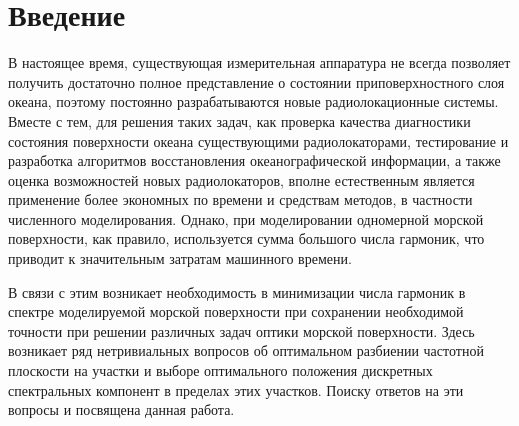 


\def\labauthors{Понур К.А.}
\def\labgroup{430}

\def\labtheme{Численное моделирование морской поверхности}
\newcommand{\tM}{\widetilde{M}}

\renewcommand{\Re}{\operatorname{Re}}
\renewcommand{\Im}{\operatorname{Im}}
\renewcommand{\phi}{\varphi}
\renewcommand{\hat}{\widehat}
\renewcommand{\vec}{\vv}

\tableofcontents
\newpage


\section{Введение}
В настоящее время, существующая измерительная аппаратура не всегда позволяет получить достаточно полное представление о состоянии приповерхностного  слоя океана, поэтому постоянно разрабатываются новые радиолокационные системы. 
Вместе с тем, для решения таких задач, как проверка качества диагностики состояния поверхности океана существующими радиолокаторами, тестирование и разработка алгоритмов восстановления океанографической информации, а также оценка возможностей новых радиолокаторов, вполне естественным является применение более экономных по времени и средствам методов, в частности численного моделирования.  Однако, при моделировании одномерной морской поверхности, как правило, используется сумма большого числа гармоник, что приводит к значительным затратам машинного времени.

В связи с этим возникает необходимость в минимизации числа гармоник в спектре моделируемой морской поверхности при сохранении необходимой точности при решении различных задач оптики морской поверхности. Здесь возникает ряд нетривиальных вопросов об оптимальном разбиении частотной плоскости на участки и выборе оптимального положения дискретных спектральных компонент в пределах этих участков. Поиску ответов на эти вопросы и посвящена данная работа.



